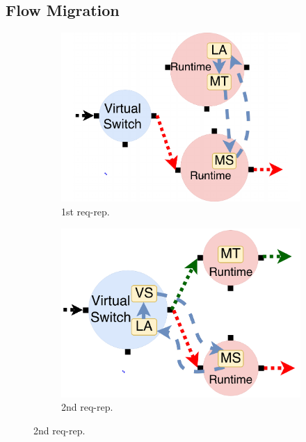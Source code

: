 \subsection{Flow Migration}
\label{sec:migration}

\begin{figure}[!t]
\begin{subfigure}[t]{0.33\linewidth}
   \centering
   \includegraphics[width=\columnwidth]{figure/nfactor-mig1.pdf}
   \caption{1st req-rep.}\label{fig:mig1}
  \end{subfigure}\hfill
  \begin{subfigure}[t]{0.33\linewidth}
     \centering
     \includegraphics[width=\columnwidth]{figure/nfactor-mig2.pdf}
     \caption{2nd req-rep.}\label{fig:mig2}
    \end{subfigure}\hfill

\end{figure}
